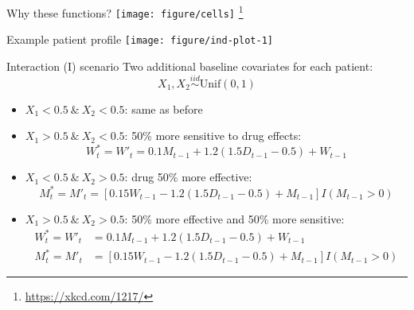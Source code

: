 \documentclass{beamer}
\newcommand\blfootnote[1]{%
  \begingroup
  \renewcommand\thefootnote{}\footnote{#1}%
  \addtocounter{footnote}{-1}%
  \endgroup
}
\begin{document}
\begin{frame}[c]{Why these functions?}
  \centering
  \texttt{[image: figure/cells]}
  \bigskip
  \blfootnote{\url{https://xkcd.com/1217/}}
\end{frame}

\begin{frame}[c]{Example patient profile}
  \texttt{[image: figure/ind-plot-1]} 
\end{frame}

\begin{frame}[c]{Interaction (I) scenario}
  Two additional baseline covariates for each patient:
  \begin{equation*}
    X_{1}, X_{2} \overset{iid}{\sim} \text{Unif}(0, 1)
  \end{equation*}
  
  \begin{itemize}[<+->]
    \item[] $X_{1} < 0.5 \ \& \ X_{2} < 0.5$: same as before
    \item[] $X_{1} > 0.5 \ \& \ X_{2} < 0.5$: 50\% more sensitive to drug effects:
  \begin{equation*}
  W^{*}_{t} = W'_{t} = 0.1 M_{t-1} + 1.2 (\mathbf{1.5} D_{t-1} - 0.5) + W_{t - 1}
  \end{equation*}
  \item[] $X_{1} < 0.5 \ \& \ X_{2} > 0.5$: drug 50\% more effective:
  \begin{equation*}
  M^{*}_{t} =  M'_{t} = [0.15 W_{t-1} - 1.2 (\mathbf{1.5} D_{t-1} - 0.5) + M_{t - 1}] I(M_{t-1} > 0)
  \end{equation*}
  \item[]   $X_{1} > 0.5 \ \& \ X_{2} > 0.5$: 50\% more effective and 50\% more sensitive:
  \begin{align*}
  W^{*}_{t} = W'_{t} &= 0.1 M_{t-1} + 1.2 (\mathbf{1.5} D_{t-1} - 0.5) + W_{t - 1} \\
  M^{*}_{t} = M'_{t} &= [0.15 W_{t-1} - 1.2 (\mathbf{1.5} D_{t-1} - 0.5) + M_{t - 1}] I(M_{t-1} > 0)
  \end{align*}
  \end{itemize}
\end{frame}
\end{document}
